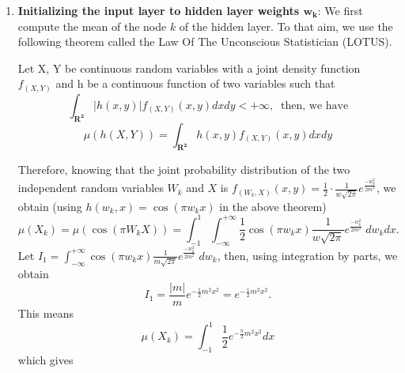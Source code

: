 \documentclass[AMS,STIX1COL]{WileyNJD-v2}
\begin{document}
\begin{enumerate}
    \item \textbf{Initializing the input layer to hidden layer weights  $\mathbf{w_k}$}: 
    We first compute the mean of the node $k$ of the hidden layer. To that aim, we use the following theorem called the Law Of The Unconscious Statistician (LOTUS).
\begin{theorem}
Let X, Y be continuous random variables with a joint density function $f_{(X,Y)}$ and h be a continuous function of two variables such that
$$\int_{\mathbf{R^2}} |h(x,y)| f_{(X,Y)}(x,y) dx dy < +\infty,\;\; \text{then, we have}$$
$$\mu\left(h(X,Y)\right) = \int_{\mathbf{R^2}} h(x,y) f_{(X,Y)}(x,y) dx dy  $$
\end{theorem}

Therefore, knowing that the joint probability distribution of the two independent random variables $W_k$ and $X$ is $f_{(W_k,X)}(x,y) = \frac{1}{2} \cdot \frac{1}{w \sqrt{2\pi}} e^{\frac{-w_k^2}{2m^2}}$, we obtain (using $h(w_k,x) = \cos(\pi w_k x)$ in the above theorem) 
\begin{equation}\label{Eq:muxk}
    \mu(X_k) = \mu(\cos(\pi W_k X)) = \int_{-1}^{1} \int_{-\infty}^{+\infty}\frac{1}{2} \cos(\pi w_k x)\frac{1}{w \sqrt{2\pi}} e^{\frac{-w_k^2}{2m^2}}\; dw_k dx.
\end{equation}
Let $I_1 = \int_{-\infty}^{+\infty} \cos(\pi w_k x)\frac{1}{m \sqrt{2\pi}} e^{\frac{-w_k^2}{2m^2}}\; dw_k$, then, using integration by parts, we obtain
$$I_1 = \frac{|m|}{m}e^{-\frac{1}{2}m^2x^2} = e^{-\frac{1}{2}m^2x^2}. $$
This means
$$ \mu(X_k) = \int_{-1}^{1}\frac{1}{2} e^{-\frac{\pi}{2}m^2x^2} dx $$
which gives


\end{enumerate}
\end{document}
